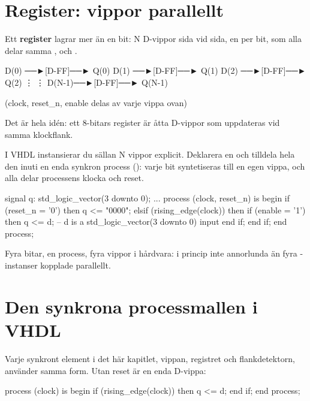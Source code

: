 \section{Register: vippor parallellt}
\label{c3:sec:register}

Ett \textbf{register} lagrar mer än en bit: N D-vippor sida vid sida, en per bit, som alla delar
samma ,  och .

\begin{textdrawing}
D(0) ──►[D-FF]──► Q(0)
D(1) ──►[D-FF]──► Q(1)
D(2) ──►[D-FF]──► Q(2)
   ⋮        ⋮
D(N-1)──►[D-FF]──► Q(N-1)

  (clock, reset_n, enable delas av varje vippa ovan)
\end{textdrawing}

Det är hela idén: ett 8-bitars register är åtta D-vippor som uppdateras vid samma klockflank.

I VHDL instansierar du sällan N vippor explicit. Deklarera en  och tilldela
hela den inuti en enda synkron process (): varje bit syntetiseras till en
egen vippa, och alla delar processens klocka och reset.

\begin{vhdlcode}
signal q: std_logic_vector(3 downto 0);
...
process (clock, reset_n) is
begin
    if (reset_n = '0') then
        q <= "0000";
    elsif (rising_edge(clock)) then
        if (enable = '1') then
            q <= d; -- d is a std_logic_vector(3 downto 0) input
        end if;
    end if;
end process;
\end{vhdlcode}

Fyra bitar, en process, fyra vippor i hårdvara: i princip inte annorlunda än fyra
-instanser kopplade parallellt.

\section{Den synkrona processmallen i VHDL}
\label{c3:sec:template}

Varje synkront element i det här kapitlet, vippan, registret och flankdetektorn, använder samma
form. Utan reset är en enda D-vippa:

\begin{vhdlcode}
process (clock) is
begin
    if (rising_edge(clock)) then
        q <= d;
    end if;
end process;
\end{vhdlcode}

